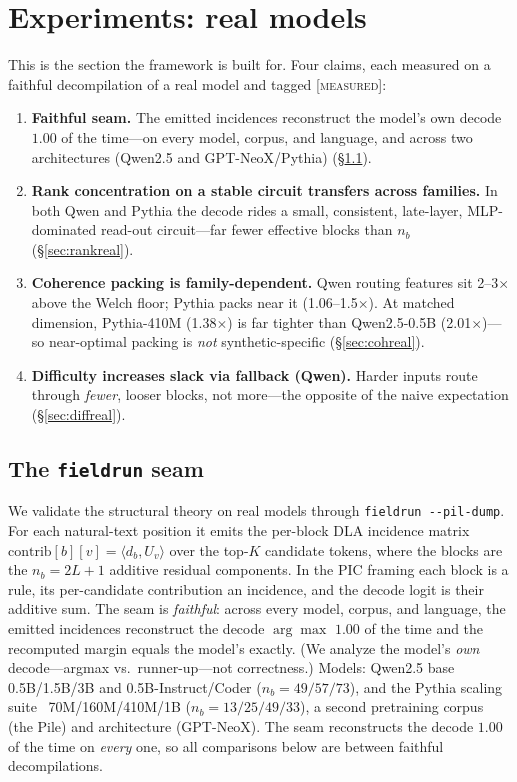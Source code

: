 \documentclass[sigconf,nonacm]{acmart}
\theoremstyle{definition}
\newcommand{\inner}[2]{\langle #1, #2\rangle}
\newcommand{\nb}{n_b}
\newcommand{\measured}{\textsc{[measured]}}
\begin{document}
\section{Experiments: real models}
\label{sec:real}

This is the section the framework is built for. Four claims, each measured on a
faithful decompilation of a real model and tagged \measured:

\begin{enumerate}
\item \textbf{Faithful seam.} The emitted incidences reconstruct the model's own
decode $1.00$ of the time---on every model, corpus, and language, and across two
architectures (Qwen2.5 and GPT-NeoX/Pythia) (\S\ref{sec:seam}).
\item \textbf{Rank concentration on a stable circuit transfers across families.} In
both Qwen and Pythia the decode rides a small, consistent, late-layer, MLP-dominated
read-out circuit---far fewer effective blocks than $\nb$ (\S\ref{sec:rankreal}).
\item \textbf{Coherence packing is family-dependent.} Qwen routing features sit
2--3$\times$ above the Welch floor; Pythia packs near it (1.06--1.5$\times$). At
matched dimension, Pythia-410M (1.38$\times$) is far tighter than Qwen2.5-0.5B
(2.01$\times$)---so near-optimal packing is \emph{not} synthetic-specific
(\S\ref{sec:cohreal}).
\item \textbf{Difficulty increases slack via fallback (Qwen).} Harder inputs route
through \emph{fewer}, looser blocks, not more---the opposite of the naive expectation
(\S\ref{sec:diffreal}).
\end{enumerate}

\subsection{The \texttt{fieldrun} seam}
\label{sec:seam}
We validate the structural theory on real models through \texttt{fieldrun
-{}-pil-dump}. For each natural-text position it emits the per-block DLA incidence
matrix $\text{contrib}[b][v]=\inner{d_b}{U_v}$ over the top-$K$ candidate tokens,
where the blocks are the $\nb=2L{+}1$ additive residual components. In the PIC
framing each block is a rule, its per-candidate contribution an incidence, and the
decode logit is their additive sum. The seam is \emph{faithful}: across every model,
corpus, and language, the emitted incidences reconstruct the decode $\arg\max$
$1.00$ of the time and the recomputed margin equals the model's exactly. (We analyze
the model's \emph{own} decode---argmax vs.\ runner-up---not correctness.) Models:
Qwen2.5 base 0.5B/1.5B/3B and 0.5B-Instruct/Coder ($\nb=49/57/73$), and the Pythia
scaling suite~\cite{biderman2023pythia} 70M/160M/410M/1B ($\nb=13/25/49/33$), a
second pretraining corpus (the Pile) and architecture (GPT-NeoX). The seam
reconstructs the decode $1.00$ of the time on \emph{every} one, so all comparisons
below are between faithful decompilations.
\end{document}

